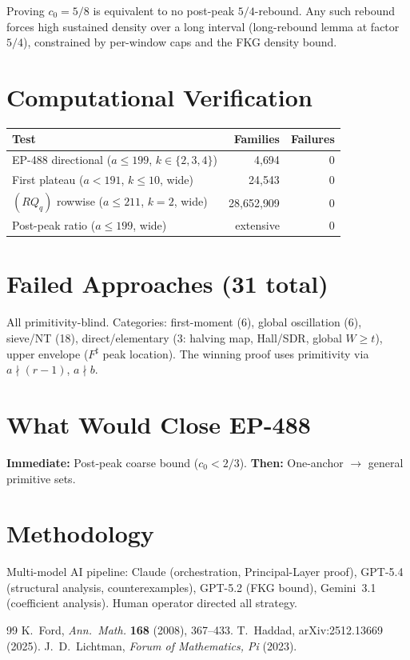 \documentclass[11pt,a4paper]{article}
\theoremstyle{definition}
\begin{document}
Proving $c_0 = 5/8$ is equivalent to no post-peak $5/4$-rebound.
Any such rebound forces high sustained density over a long interval
(long-rebound lemma at factor $5/4$), constrained by per-window caps
and the FKG density bound.

\section{Computational Verification}

\begin{center}
\begin{tabular}{lrr}
\toprule
\textbf{Test} & \textbf{Families} & \textbf{Failures} \\
\midrule
EP-488 directional ($a \leq 199$, $k \in \{2,3,4\}$) & 4{,}694 & 0 \\
First plateau ($a < 191$, $k \leq 10$, wide) & 24{,}543 & 0 \\
$(RQ_q)$ rowwise ($a \leq 211$, $k = 2$, wide) & 28{,}652{,}909 & 0 \\
Post-peak ratio ($a \leq 199$, wide) & extensive & 0 \\
\bottomrule
\end{tabular}
\end{center}

\section{Failed Approaches (31 total)}

All primitivity-blind. Categories: first-moment (6), global oscillation (6),
sieve/NT (18), direct/elementary (3: halving map, Hall/SDR, global $W \geq t$),
upper envelope ($F^{\sharp}$ peak location). The winning proof uses primitivity
via $a \nmid (r-1)$, $a \nmid b$.

\section{What Would Close EP-488}

\textbf{Immediate:} Post-peak coarse bound ($c_0 < 2/3$).
\textbf{Then:} One-anchor $\to$ general primitive sets.

\section{Methodology}

Multi-model AI pipeline: Claude (orchestration, Principal-Layer proof),
GPT-5.4 (structural analysis, counterexamples), GPT-5.2 (FKG bound),
Gemini~3.1 (coefficient analysis). Human operator directed all strategy.

\begin{thebibliography}{99}
 K.~Ford, \emph{Ann.\ Math.} \textbf{168} (2008), 367--433.
 T.~Haddad, arXiv:2512.13669 (2025).
 J.~D.~Lichtman, \emph{Forum of Mathematics, Pi} (2023).
\end{thebibliography}
\end{document}
